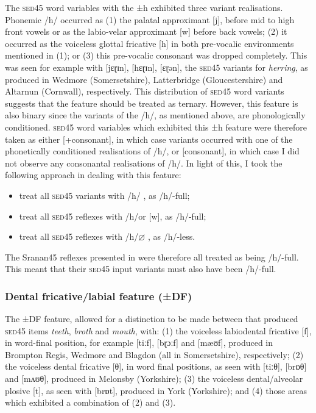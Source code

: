{{{The \textsc{sed45} word variables with the ±h exhibited three variant realisations. Phonemic /h/ occurred as (1) the palatal approximant [j], before mid to high front vowels or as the labio-velar approximant [w] before back vowels; (2) it occurred as the voiceless glottal fricative [h] in both pre-vocalic environments mentioned in (1); or (3) this pre-vocalic consonant was dropped completely. This was seen for example with [jɛɽɪn], [hɛɽɪn], [ɛɽən], the \textsc{sed45} variants for \emph{herring}, as produced in Wedmore (Somersetshire), Latterbridge (Gloucestershire) and Altarnun (Cornwall), respectively. This distribution of \textsc{sed45} word variants suggests that the feature should be treated as ternary. However, this feature is also binary since the variants of the /h/, as mentioned above, are phonologically conditioned. \textsc{sed45} word variables which exhibited this ±h feature were therefore taken as either [+consonant], in which case variants occurred with one of the phonetically conditioned realisations of /h/, or [\textminus consonant], in which case I did not observe any consonantal realisations of /h/. In light of this, I took the following approach in dealing with this feature:

\begin{itemize}
\item {treat all \textsc{sed45} variants with /h/ \textrightarrow [h], as /h/-full;}
\item {treat all \textsc{sed45} reflexes with /h/\textrightarrow [j] or [w], as /h/-full;}
\item{treat all \textsc{sed45} reflexes with /h/\textrightarrow $\varnothing$ , as /h/-less.}
\end{itemize}

The Sranan45 reflexes presented in  were therefore all treated as being /h/-full. This meant that their \textsc{sed45} input variants must also have been /h/-full.

\subsubsection{Dental fricative/labial feature (±DF)} \label{3.3.2.4}
The ±DF feature, allowed for a distinction to be made between  that produced \textsc{sed45} items \emph{teeth},  \emph{broth} and  \emph{mouth}, with: (1) the voiceless labiodental fricative [f], in word-final position, for example [tiːf], [bɽɔːf] and [mæʊf], produced in Brompton Regis, Wedmore and Blagdon (all in Somersetshire), respectively; (2) the voiceless dental fricative [θ], in word final positions, as seen with [tiːθ], [brɒθ]  and [mʌʊθ], produced in Melonsby (Yorkshire); (3) the voiceless dental/alveolar plosive [t], as seen with [brɒt], produced in York (Yorkshire); and (4) those areas which exhibited a combination of (2) and (3).

}}}
